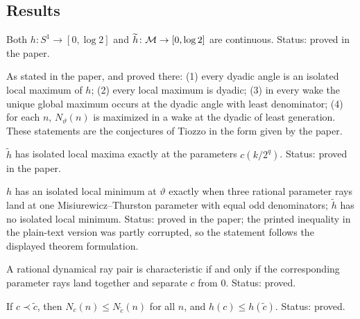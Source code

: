\subsection*{Results}

\begin{theorem}
\label{thm:core-1-1}
Both $h\colon S^1\to[0,\log2]$ and $\widetilde h\colon\mathcal M\to[0,\log2]$ are continuous.  Status: proved in the paper.
\end{theorem}

\begin{theorem}
\label{thm:core-4-1}
As stated in the paper, and proved there: (1) every dyadic angle is an isolated local maximum of $h$;
(2) every local maximum is dyadic; (3) in every wake the unique global maximum occurs at the dyadic angle with
least denominator; (4) for each $n$, $N_\vartheta(n)$ is maximized in a wake at the dyadic of least generation.
These statements are the conjectures of Tiozzo in the form given by the paper.
\end{theorem}

\begin{corollary}
\label{cor:core-4-2}
$\widetilde h$ has isolated local maxima exactly at the parameters $c(k/2^q)$.  Status: proved in the paper.
\end{corollary}

\begin{theorem}
\label{thm:core-4-3}
$h$ has an isolated local minimum at $\vartheta$ exactly when three rational parameter rays land at one
Misiurewicz--Thurston parameter with equal odd denominators; $\widetilde h$ has no isolated local minimum.
Status: proved in the paper; the printed inequality in the plain-text version was partly corrupted, so the
statement follows the displayed theorem formulation.
\end{theorem}

\begin{theorem}
\label{thm:core-2-4}
A rational dynamical ray pair is characteristic if and only if the corresponding parameter rays land together
and separate $c$ from $0$.  Status: proved.
\end{theorem}

\begin{theorem}
\label{thm:core-2-5}
If $c\prec\widetilde c$, then $N_c(n)\le N_{\widetilde c}(n)$ for all $n$, and $h(c)\le h(\widetilde c)$.  Status: proved.
\end{theorem}

